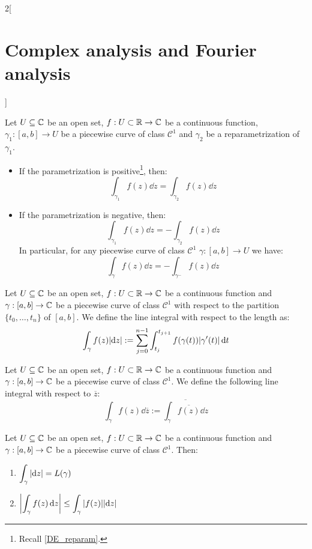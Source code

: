 \documentclass[../../../main.tex]{subfiles}
\begin{document}
\begin{multicols}{2}[\section{Complex analysis and Fourier analysis}]
\begin{proposition}
    Let $U\subseteq \mathbb{C}$ be an open set, $f:U\subset\mathbb{R}\rightarrow\mathbb{C}$ be a continuous function, $\gamma_1:[a,b]\rightarrow U$ be a piecewise curve of class $\mathcal{C}^1$ and $\gamma_2$ be a reparametrization of $\gamma_1$.
    \begin{itemize}
      \item If the parametrization is positive\footnote{Recall \cref{DE_reparam}.}, then: $$\int_{\gamma_1}f(z)\dd{z}=\int_{\gamma_2}f(z)\dd{z}$$
      \item If the parametrization is negative, then: $$\int_{\gamma_1}f(z)\dd{z}=-\int_{\gamma_2}f(z)\dd{z}$$
            In particular, for any piecewise curve of class $\mathcal{C}^1$ $\gamma:[a,b]\rightarrow U$ we have: $$\int_{\gamma}f(z)\dd{z}=-\int_{\gamma^-}f(z)\dd{z}$$
    \end{itemize}
  \end{proposition}
  \begin{definition}
    Let $U\subseteq \mathbb{C}$ be an open set, $f:U\subset\mathbb{R}\rightarrow\mathbb{C}$ be a continuous function and $\gamma:[a,b]\rightarrow\mathbb{C}$ be a piecewise curve of class $\mathcal{C}^1$ with respect to the partition $\{t_0,\ldots,t_n\}$ of $[a,b]$. We define the line integral with respect to the length as: $$\int_{\gamma}f(z)\abs{\dd{z}}:=\sum_{j=0}^{n-1}\int_{t_j}^{t_{j+1}}f(\gamma(t))|\gamma'(t)|\dd{t}$$
  \end{definition}
  \begin{definition}
    Let $U\subseteq \mathbb{C}$ be an open set, $f:U\subset\mathbb{R}\rightarrow\mathbb{C}$ be a continuous function and $\gamma:[a,b]\rightarrow\mathbb{C}$ be a piecewise curve of class $\mathcal{C}^1$. We define the following line integral with respect to $\overline{z}$: $$\int_{\gamma}f(z)\dd{\overline{z}}:=\overline{\int_{\gamma}\overline{f(z)}\dd{z}}$$
  \end{definition}
  \begin{proposition}
    Let $U\subseteq \mathbb{C}$ be an open set, $f:U\subset\mathbb{R}\rightarrow\mathbb{C}$ be a continuous function and $\gamma:[a,b]\rightarrow\mathbb{C}$ be a piecewise curve of class $\mathcal{C}^1$. Then:
    \begin{enumerate}
      \item $\displaystyle\int_{\gamma}\abs{\dd{z}}=L(\gamma)$
      \item $\displaystyle\left|\int_{\gamma}f(z)\dd{z}\right|\leq\int_{\gamma}|f(z)|\abs{\dd{z}}$
    \end{enumerate}
  \end{proposition}

\end{multicols}
\end{document}
